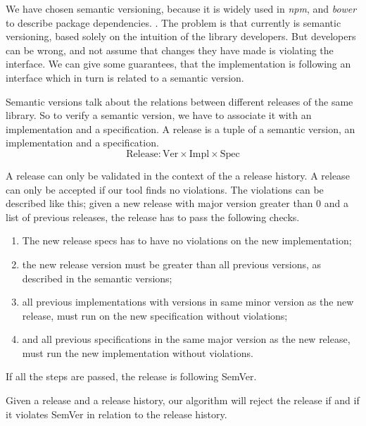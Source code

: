 We have chosen semantic versioning, because it is widely used in \emph{npm}, and
\emph{bower} to describe package dependencies. . The problem is that
currently is semantic versioning, based solely on the intuition of the library
developers.  But developers can be wrong, and not assume that changes they have
made is violating the interface. We can give some guarantees, that the
implementation is following an interface which in turn is related to a semantic
version. 

Semantic versions talk about the relations between different releases of the
same library. So to verify a semantic version, we have to associate it with an
implementation and a specification. A release is  a tuple of a semantic
version, an implementation and a specification.
$$ \text{Release} : \text{Ver} \times \text{Impl} \times \text{Spec} $$

A release can only be validated in the context of the a release history. A
release can only be accepted if our tool finds no violations. The violations
can be described like this; given a new release with major version greater than
0 and a list of previous releases, the release has to pass the following
checks.

\begin{enumerate}
    \item The new release specs has to have no violations on the new
    implementation;
    \item the new release version must be greater than all previous versions, as
    described in the semantic versions;
    \item all previous implementations with versions in same minor version as the
    new release, must run on the new specification without violations;
    \item and all previous specifications in the same major version as the new
    release, must run the new implementation without violations.
\end{enumerate}

If all the steps are passed, the release is following SemVer. 

\begin{theorem}[Soundness]
Given a release and a release history, our algorithm will reject the release if
and if it violates SemVer in relation to the release history.
\end{theorem}

